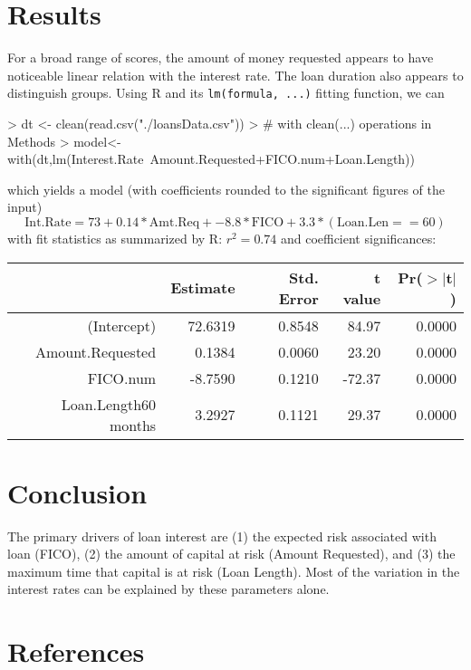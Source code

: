 \documentclass{article}
\begin{document}
\section{Results}
For a broad range of scores, the amount of money requested appears to have noticeable linear relation with the interest rate.  The loan duration also appears to distinguish groups.  Using R and its \texttt{lm(formula, ...)} fitting function, we can
\begin{Schunk}
\begin{Sinput}
> dt <- clean(read.csv("./loansData.csv"))
> # with clean(...) operations in Methods
> model<-with(dt,{lm(Interest.Rate~Amount.Requested+FICO.num+Loan.Length)})
\end{Sinput}
\end{Schunk}
which yields a model (with coefficients rounded to the significant figures of the input)
$$
\textrm{Int.Rate} = 73 + 0.14*\textrm{Amt.Req} + -8.8*\textrm{FICO} + 3.3*(\textrm{Loan.Len} == 60)
$$
with fit statistics as summarized by R: $r^2 = 0.74$ and coefficient significances:
\begin{table}[ht]
\centering
\begin{tabular}{rrrrr}
  \hline
 & Estimate & Std. Error & t value & Pr($>$$|$t$|$) \\ 
  \hline
(Intercept) & 72.6319 & 0.8548 & 84.97 & 0.0000 \\ 
  Amount.Requested & 0.1384 & 0.0060 & 23.20 & 0.0000 \\ 
  FICO.num & -8.7590 & 0.1210 & -72.37 & 0.0000 \\ 
  Loan.Length60 months & 3.2927 & 0.1121 & 29.37 & 0.0000 \\ 
   \hline
\end{tabular}
\end{table}
\section{Conclusion}
The primary drivers of loan interest are (1) the expected risk associated with loan (FICO), (2) the amount of capital at risk (Amount Requested), and (3) the maximum time that capital is at risk (Loan Length).  Most of the variation in the interest rates can be explained by these parameters alone.

\section{References}


\end{document}
